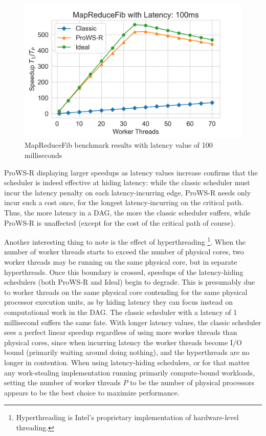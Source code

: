 \documentclass[bsc,frontabs,singlespacing,parskip,deptreport,normalheadings]{infthesis}
\begin{document}
\begin{figure}[ht]
    \centering
    \includegraphics[width=0.8\linewidth]{figures/map_reduce_plot_latency_100.png}
    \caption{MapReduceFib benchmark results with latency value of 100 milliseconds}
    \label{fig:map_reduce_plots_100ms}
\end{figure}

ProWS-R displaying larger speedups as latency values increase confirms that the
scheduler is indeed effective at hiding latency: while the classic scheduler
must incur the latency penalty on each latency-incurring edge, ProWS-R needs
only incur such a cost once, for the longest latency-incurring on the critical
path. Thus, the more latency in a DAG, the more the classic scheduler suffers,
while ProWS-R is unaffected (except for the cost of the critical path of
course).

Another interesting thing to note is the effect of hyperthreading
\footnote{Hyperthreading is Intel's proprietary implementation of hardware-level
threading.}. When the number of worker threads starts to exceed the number of
physical cores, two worker threads may be running on the same physical core, but
in separate hyperthreads. Once this boundary is crossed, speedups of the
latency-hiding schedulers (both ProWS-R and Ideal) begin to degrade. This is
presumably due to worker threads on the same physical core contending for the
same physical processor execution units, as by hiding latency they can focus
instead on computational work in the DAG. The classic scheduler with a latency
of 1 millisecond suffers the same fate. With longer latency values, the classic
scheduler sees a perfect linear speedup regardless of using more worker threads
than physical cores, since when incurring latency the worker threads become I/O
bound (primarily waiting around doing nothing), and the hyperthreads are no
longer in contention. When using latency-hiding schedulers, or for that matter
any work-stealing implementation running primarily compute-bound workloads,
setting the number of worker threads \(P\) to be the number of physical
processors appears to be the best choice to maximize performance.
\end{document}

